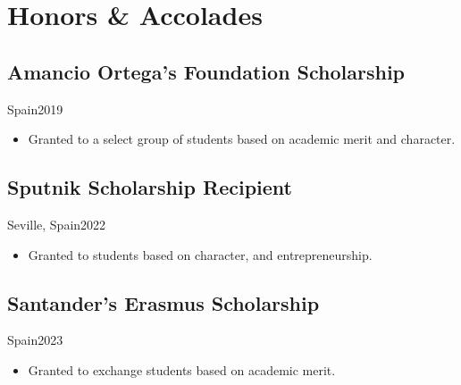 \section{Honors \& Accolades}
\subsection{Amancio Ortega's Foundation Scholarship}{Spain}{2019}
\begin{itemize}
    \item Granted to a select group of students based on academic merit and character.
\end{itemize}
\subsection{Sputnik Scholarship Recipient}{Seville, Spain}{2022} 
\begin{itemize}
    \item Granted to students based on character, and entrepreneurship.
\end{itemize}
\subsection{Santander's Erasmus Scholarship}{Spain}{2023}
\begin{itemize}
    \item Granted to exchange students based on academic merit.
\end{itemize}
